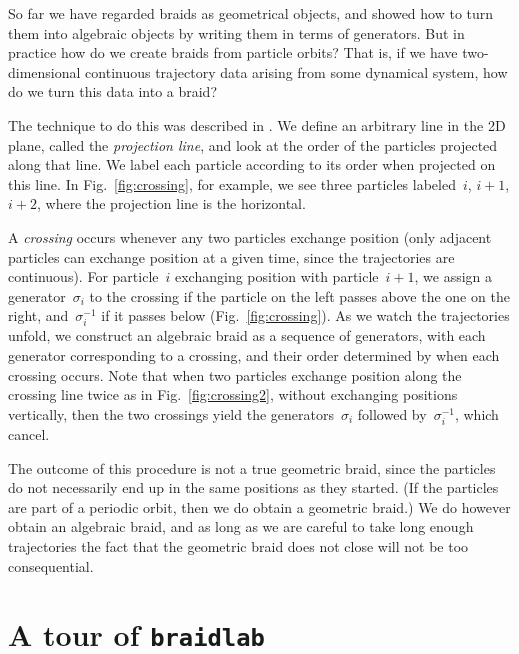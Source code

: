 \documentclass[12pt]{article}
\newcommand{\braidlab}{\texttt{braidlab}}%
\begin{document}
So far we have regarded braids as geometrical objects, and showed how to turn
them into algebraic objects by writing them in terms of generators.  But in
practice how do we create braids from particle orbits?  That is, if we have
two-dimensional continuous trajectory data arising from some dynamical system,
how do we turn this data into a braid?

%
The technique to do this was described in \citet{Thiffeault2005}.  We define
an arbitrary line in the 2D plane, called the \emph{projection line}, and look
at the order of the particles projected along that line.  We label each
particle according to its order when projected on this line.  In
Fig.~\ref{fig:crossing}, for example, we see three particles labeled~$i$,
$i+1$, $i+2$, where the projection line is the horizontal.

%
A \emph{crossing} occurs whenever any two particles exchange position (only
adjacent particles can exchange position at a given time, since the
trajectories are continuous).  For particle~$i$ exchanging position with
particle~$i+1$, we assign a generator~$\sigma_i$ to the crossing if the
particle on the left passes above the one on the right, and~$\sigma_i^{-1}$ if
it passes below (Fig.~\ref{fig:crossing}).  As we watch the trajectories
unfold, we construct an algebraic braid as a sequence of generators, with each
generator corresponding to a crossing, and their order determined by when each
crossing occurs.  Note that when two particles exchange position along the
crossing line twice as in Fig.~\ref{fig:crossing2}, without exchanging
positions vertically, then the two crossings yield the generators~$\sigma_i$
followed by~$\sigma_i^{-1}$, which cancel. %
%
%

The outcome of this procedure is not a true geometric braid, since the
particles do not necessarily end up in the same positions as they started.
(If the particles are part of a periodic orbit, then we do obtain a geometric
braid.)  We do however obtain an algebraic braid, and as long as we are
careful to take long enough trajectories the fact that the geometric braid
does not close will not be too consequential.

%


\section{A tour of \braidlab}
\label{sec:tour}
\end{document}
